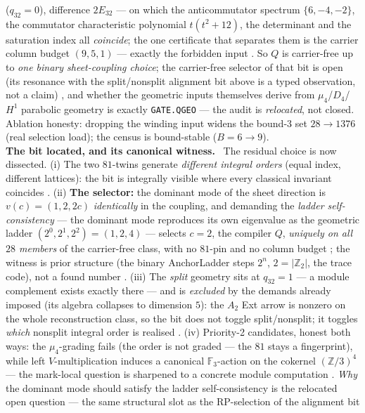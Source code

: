 \documentclass[11pt,a4paper]{article}
\newcommand{\Z}{\mathbb{Z}}
\theoremstyle{definition}
\begin{document}
\begin{winbox}
($q_{32}=0$), difference $2E_{32}$ --- on which the anticommutator spectrum $\{6,-4,-2\}$, the
commutator characteristic polynomial $t(t^2{+}12)$, the determinant and the saturation index all
\emph{coincide}; the one certificate that separates them is the carrier column budget $(9,5,1)$ ---
exactly the forbidden input \mE.  So $Q$ is carrier-free up to \emph{one binary sheet-coupling
choice}; the carrier-free selector of that bit is open (its resonance with the split/nonsplit
alignment bit above is a typed observation, not a claim) \mO, and whether the geometric inputs
themselves derive from $\mu_4$/$D_4$/$H^1$ parabolic geometry is exactly \texttt{GATE.QGEO} ---
the audit is \emph{relocated}, not closed.  Ablation honesty: dropping the winding input widens
the bound-$3$ set $28\to1376$ (real selection load); the census is bound-stable ($B=6\to9$).
\smallskip\\
\noindent\textbf{The bit located, and its canonical witness.}
\ The residual choice is now dissected.  (i) The two
$81$-twins generate \emph{different integral orders} (equal index, different lattices): the bit
is integrally visible where every classical invariant coincides \mE.  (ii) \textbf{The
selector:} the dominant mode of the sheet direction is $v(c)=(1,2,2c)$ \emph{identically} in the
coupling, and demanding the \emph{ladder self-consistency} --- the dominant mode reproduces its
own eigenvalue as the geometric ladder $(2^0,2^1,2^2)=(1,2,4)$ --- selects $c=2$, the compiler
$Q$, \emph{uniquely on all $28$ members} of the carrier-free class, with no $81$-pin and no
column budget \mE; the witness is prior structure (the binary AnchorLadder steps $2^n$,
$2=|\Z_2|$, the trace code), not a found number \mC.  (iii) The \emph{split} geometry sits at
$q_{32}=1$ --- a module complement exists exactly there --- and is \emph{excluded} by the
demands already imposed (its algebra collapses to dimension $5$): the $A_2$ Ext arrow is
nonzero on the whole reconstruction class, so the bit does not toggle split/nonsplit; it
toggles \emph{which} nonsplit integral order is realised \mE.  (iv) Priority-2 candidates,
honest both ways: the $\mu_4$-grading fails (the order is not graded --- the $81$ stays a
fingerprint), while left $V$-multiplication induces a canonical $\mathbb F_3$-action on the
cokernel $(\Z/3)^4$ --- the mark-local question is sharpened to a concrete module computation
\mO.  \emph{Why} the dominant mode should satisfy the ladder self-consistency is the relocated
open question --- the same structural slot as the RP-selection of the alignment bit

\end{winbox}
\end{document}
